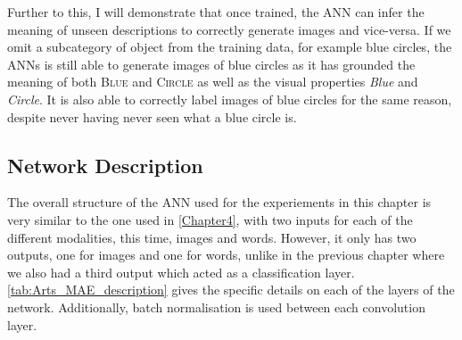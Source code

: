 Further to this, I will demonstrate that once trained, the \ac{ANN} can infer the meaning of unseen descriptions to correctly generate images and vice-versa. If we omit a subcategory of object from the training data, for example blue circles, the \acp{ANN} is still able to generate images of blue circles as it has grounded the meaning of both \textsc{Blue} and \textsc{Circle} as well as the visual properties \textit{Blue} and \textit{Circle}. It is also able to correctly label images of blue circles for the same reason, despite never having never seen what a blue circle is.


\subsection{Network Description}
The overall structure of the \ac{ANN} used for the experiements in this chapter is very similar to the one used in \autoref{Chapter4}, with two inputs for each of the different modalities, this time, images and words. However, it only has two outputs, one for images and one for words, unlike in the previous chapter where we also had a third output which acted as a classification layer. \autoref{tab:Arts_MAE_description}  gives the specific details on each of the layers of the network. Additionally, batch normalisation is used between each convolution layer.

